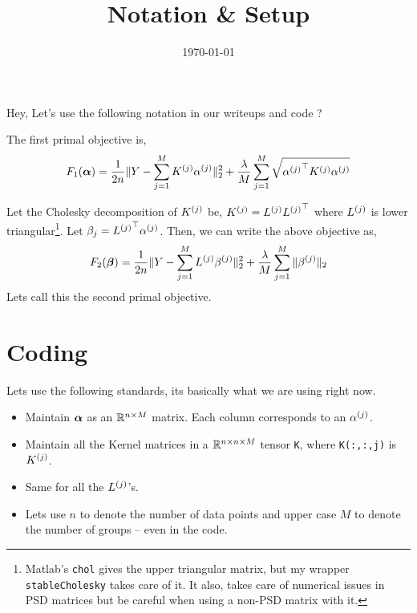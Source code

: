 \documentclass[10pt]{article}
\title{\textbf{Notation \& Setup}}
\author{}
\date{\today}
\begin{document}
\maketitle

Hey, Let's use the following notation in our writeups and code ?

The first primal objective is,
\[
F_1({\bm{\alpha}}) = \frac{1}{2n} \|Y - \sum_{j=1}^M {K^{(j)}} {\alpha^{(j)}} \|_2^2 
  + \frac{\lambda}{M} \sum_{j=1}^M \sqrt{{\alpha^{(j)}}^\top {K^{(j)}} {\alpha^{(j)}}}
\]

Let the Cholesky decomposition of ${K^{(j)}}$ be, ${K^{(j)}} = {L^{(j)}} {L^{(j)}}^\top$ where
${L^{(j)}}$ is lower triangular\footnote{Matlab's \texttt{chol} gives the upper triangular
matrix, but my wrapper \texttt{stableCholesky} takes care of it. It also,
takes care of numerical issues in PSD matrices but be careful when using a
non-PSD matrix with it.}. Let  $\beta_j =  {L^{(j)}}^\top {\alpha^{(j)}}$. Then, we can write
the above objective as,
\[
F_2({\bm{\beta}}) = \frac{1}{2n}\|Y - \sum_{j=1}^M {L^{(j)}} {\beta^{(j)}}\|_2^2 +
  \frac{\lambda}{M}\sum_{j=1}^M \|{\beta^{(j)}}\|_2
\]
Lets call this the second primal objective.


\section*{Coding}

Lets use the following standards, its basically what we are using right now.
\begin{itemize}
\item Maintain ${\bm{\alpha}}$ as an $\mathbb{R}^{n\times M}$ matrix. Each column corresponds
to an ${\alpha^{(j)}}$.
\item Maintain all the Kernel matrices in a $\mathbb{R}^{n\times n\times M}$ tensor
\texttt{K}, where \texttt{K(:,:,j)} is ${K^{(j)}}$.
\item Same for all the ${L^{(j)}}$'s.
\item Lets use $n$ to denote the number of data points and upper case $M$ to
denote the number of groups -- even in the code.
\end{itemize}







\end{document}
